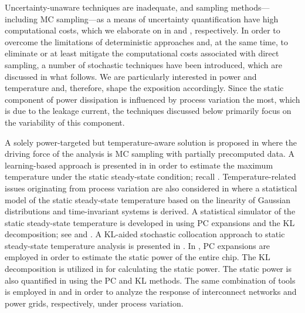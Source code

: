 Uncertainty-unaware techniques are inadequate, and sampling methods---including
\ac{MC} sampling---as a means of uncertainty quantification have high
computational costs, which we elaborate on in  and
, respectively. In order to overcome the limitations of
deterministic approaches and, at the same time, to eliminate or at least
mitigate the computational costs associated with direct sampling, a number of
stochastic techniques have been introduced, which are discussed in what follows.
We are particularly interested in power and temperature and, therefore, shape
the exposition accordingly. Since the static component of power dissipation is
influenced by process variation the most, which is due to the leakage current,
the techniques discussed below primarily focus on the variability of this
component.

A solely power-targeted but temperature-aware solution is proposed in
\cite{chandra2010} where the driving force of the analysis is \ac{MC} sampling
with partially precomputed data. A learning-based approach is presented in
\cite{juan2011} in order to estimate the maximum temperature under the static
steady-state condition; recall .
Temperature-related issues originating from process variation are also
considered in \cite{juan2012} where a statistical model of the static
steady-state temperature based on the linearity of Gaussian distributions and
time-invariant systems is derived. A statistical simulator of the static
steady-state temperature is developed in \cite{huang2009a} using \ac{PC}
expansions and the \ac{KL} decomposition; see 
and . A \ac{KL}-aided stochastic collocation
\cite{maitre2010, xiu2010} approach to static steady-state temperature analysis
is presented in \cite{lee2013}. In \cite{shen2009}, \ac{PC} expansions are
employed in order to estimate the static power of the entire chip. The \ac{KL}
decomposition is utilized in \cite{bhardwaj2006} for calculating the static
power. The static power is also quantified in \cite{bhardwaj2008} using the
\ac{PC} and \ac{KL} methods. The same combination of tools is employed in
\cite{vrudhula2006} and \cite{ghanta2006} in order to analyze the response of
interconnect networks and power grids, respectively, under process variation.

